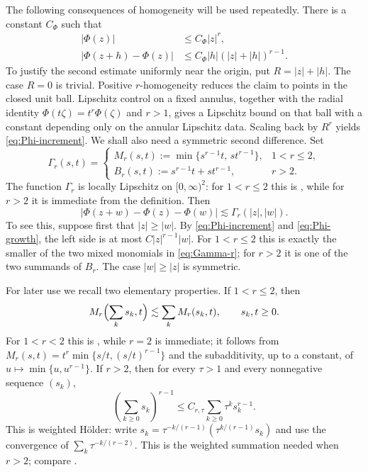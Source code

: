 \documentclass[11pt]{amsart}
\numberwithin{equation}{section}
\theoremstyle{definition}
\theoremstyle{remark}
\begin{document}
The following consequences of homogeneity will be used repeatedly.  There is
a constant $C_\Phi$ such that
\begin{align}
 |\Phi(z)|&\le C_\Phi |z|^r,                                      \label{eq:Phi-growth}\\
 |\Phi(z+h)-\Phi(z)|
 &\le C_\Phi |h|(|z|+|h|)^{r-1}.                                 \label{eq:Phi-increment}
\end{align}
To justify the second estimate uniformly near the origin, put
$R=|z|+|h|$.  The case $R=0$ is trivial.  Positive $r$-homogeneity reduces the
claim to points in the closed unit ball.  Lipschitz control on a fixed annulus,
together with the radial identity
$\Phi(t\zeta)=t^r\Phi(\zeta)$ and $r>1$, gives a Lipschitz bound on that
ball with a constant depending only on the annular Lipschitz data.  Scaling
back by $R^r$ yields \eqref{eq:Phi-increment}.  We shall also need a symmetric
second difference.  Set
\begin{equation}\label{eq:Gamma-r}
 \Gamma_r(s,t)=
 \begin{cases}
  M_r(s,t):=\min\{s^{r-1}t,\,st^{r-1}\},&1<r\le2,\\[2mm]
  B_r(s,t):=s^{r-1}t+st^{r-1},&r>2.
 \end{cases}
\end{equation}
The function $\Gamma_r$ is locally Lipschitz on $[0,\infty)^2$: for
$1<r\le2$ this is \cite[Lemma~6.8]{Stolyarov24}, while for $r>2$ it is
immediate from the definition.
Then
\begin{equation}\label{eq:Phi-second-difference}
 |\Phi(z+w)-\Phi(z)-\Phi(w)|
 \lesssim \Gamma_r(|z|,|w|).
\end{equation}
To see this, suppose first that $|z|\ge|w|$.  By
\eqref{eq:Phi-increment} and \eqref{eq:Phi-growth}, the left side is at most
$C|z|^{r-1}|w|$.  For $1<r\le2$ this is exactly the smaller of the two mixed
monomials in \eqref{eq:Gamma-r}; for $r>2$ it is one of the two summands of
$B_r$.  The case $|w|\ge|z|$ is symmetric.

For later use we recall two elementary properties.  If $1<r\le2$, then
\begin{equation}\label{eq:Mr-subadditive}
 M_r\Bigl(\sum_k s_k,t\Bigr)\lesssim\sum_k M_r(s_k,t),
 \qquad s_k,t\ge0.
\end{equation}
For $1<r<2$ this is \cite[Lemma~6.9]{Stolyarov24}, while $r=2$ is immediate; it follows from
$M_r(s,t)=t^r\min\{s/t,(s/t)^{r-1}\}$ and the subadditivity, up to a constant,
of $u\mapsto\min\{u,u^{r-1}\}$.  If $r>2$, then for every $\tau>1$ and every
nonnegative sequence $(s_k)$,
\begin{equation}\label{eq:weighted-holder}
 \left(\sum_{k\ge0}s_k\right)^{r-1}
 \le C_{r,\tau}\sum_{k\ge0}\tau^k s_k^{r-1}.
\end{equation}
This is weighted H\"older: write
$s_k=\tau^{-k/(r-1)}(\tau^{k/(r-1)}s_k)$ and use the convergence of
$\sum_k\tau^{-k/(r-2)}$.  This is the weighted summation needed when $r>2$; compare
\cite[Section~5]{Stolyarov24}.
\end{document}
